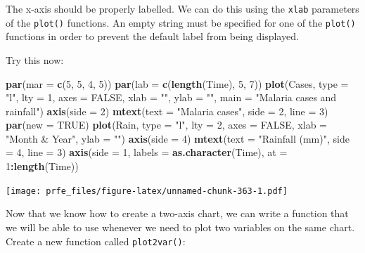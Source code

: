 \documentclass[12pt,a4paper]{book}
\newenvironment{Shaded}{\begin{snugshade}}{\end{snugshade}}
\newcommand{\DataTypeTok}[1]{\textcolor[rgb]{0.13,0.29,0.53}{#1}}
\newcommand{\DecValTok}[1]{\textcolor[rgb]{0.00,0.00,0.81}{#1}}
\newcommand{\KeywordTok}[1]{\textcolor[rgb]{0.13,0.29,0.53}{\textbf{#1}}}
\newcommand{\NormalTok}[1]{#1}
\newcommand{\OperatorTok}[1]{\textcolor[rgb]{0.81,0.36,0.00}{\textbf{#1}}}
\newcommand{\OtherTok}[1]{\textcolor[rgb]{0.56,0.35,0.01}{#1}}
\newcommand{\StringTok}[1]{\textcolor[rgb]{0.31,0.60,0.02}{#1}}
\theoremstyle{definition}
\theoremstyle{definition}
\theoremstyle{definition}
\theoremstyle{remark}
\begin{document}
The x-axis should be properly labelled. We can do this using the
\texttt{xlab} parameters of the \texttt{plot()} functions. An empty
string must be specified for one of the \texttt{plot()} functions in
order to prevent the default label from being displayed.

Try this now:

\begin{Shaded}
\begin{Highlighting}[]
\KeywordTok{par}\NormalTok{(}\DataTypeTok{mar =} \KeywordTok{c}\NormalTok{(}\DecValTok{5}\NormalTok{, }\DecValTok{5}\NormalTok{, }\DecValTok{4}\NormalTok{, }\DecValTok{5}\NormalTok{))}
\KeywordTok{par}\NormalTok{(}\DataTypeTok{lab =} \KeywordTok{c}\NormalTok{(}\KeywordTok{length}\NormalTok{(Time), }\DecValTok{5}\NormalTok{, }\DecValTok{7}\NormalTok{))}
\KeywordTok{plot}\NormalTok{(Cases, }\DataTypeTok{type =} \StringTok{"l"}\NormalTok{, }\DataTypeTok{lty =} \DecValTok{1}\NormalTok{, }\DataTypeTok{axes =} \OtherTok{FALSE}\NormalTok{,}
     \DataTypeTok{xlab =} \StringTok{""}\NormalTok{, }\DataTypeTok{ylab =} \StringTok{""}\NormalTok{, }\DataTypeTok{main =} \StringTok{"Malaria cases and rainfall"}\NormalTok{)}
\KeywordTok{axis}\NormalTok{(}\DataTypeTok{side =} \DecValTok{2}\NormalTok{)}
\KeywordTok{mtext}\NormalTok{(}\DataTypeTok{text =} \StringTok{"Malaria cases"}\NormalTok{, }\DataTypeTok{side =} \DecValTok{2}\NormalTok{, }\DataTypeTok{line =} \DecValTok{3}\NormalTok{)}
\KeywordTok{par}\NormalTok{(}\DataTypeTok{new =} \OtherTok{TRUE}\NormalTok{)}
\KeywordTok{plot}\NormalTok{(Rain, }\DataTypeTok{type =} \StringTok{"l"}\NormalTok{, }\DataTypeTok{lty =} \DecValTok{2}\NormalTok{, }\DataTypeTok{axes =} \OtherTok{FALSE}\NormalTok{,}
     \DataTypeTok{xlab =} \StringTok{"Month & Year"}\NormalTok{, }\DataTypeTok{ylab =} \StringTok{""}\NormalTok{)}
\KeywordTok{axis}\NormalTok{(}\DataTypeTok{side =} \DecValTok{4}\NormalTok{)}
\KeywordTok{mtext}\NormalTok{(}\DataTypeTok{text =} \StringTok{"Rainfall (mm)"}\NormalTok{, }\DataTypeTok{side =} \DecValTok{4}\NormalTok{, }\DataTypeTok{line =} \DecValTok{3}\NormalTok{)}
\KeywordTok{axis}\NormalTok{(}\DataTypeTok{side =} \DecValTok{1}\NormalTok{, }\DataTypeTok{labels =} \KeywordTok{as.character}\NormalTok{(Time), }\DataTypeTok{at =} \DecValTok{1}\OperatorTok{:}\KeywordTok{length}\NormalTok{(Time))}
\end{Highlighting}
\end{Shaded}

\texttt{[image: prfe\_files/figure-latex/unnamed-chunk-363-1.pdf]}

Now that we know how to create a two-axis chart, we can write a function
that we will be able to use whenever we need to plot two variables on
the same chart. Create a new function called \texttt{plot2var()}:
\end{document}
